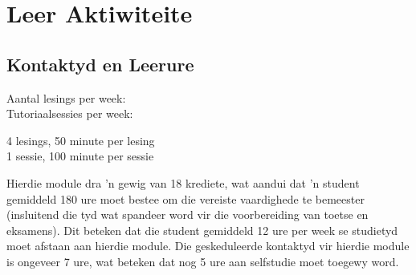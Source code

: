 \section{Leer Aktiwiteite}
    \subsection{Kontaktyd en Leerure}
        \begin{minipage}{0.4\linewidth}
            Aantal lesings per week: \\
            Tutoriaalsessies per week:
        \end{minipage}
        \begin{minipage}{0.4\linewidth}
            4 lesings, 50 minute per lesing \\
            1 sessie, 100 minute per sessie
        \end{minipage}

        Hierdie module dra 'n gewig van 18 krediete, wat aandui dat 'n student 
        gemiddeld 180 ure moet bestee om die vereiste vaardighede te bemeester
        (insluitend die tyd wat spandeer word vir die voorbereiding van toetse
        en eksamens).  Dit beteken dat die student gemiddeld 12 ure per week se studietyd
        moet afstaan aan hierdie module.  Die geskeduleerde kontaktyd vir hierdie
        module is ongeveer 7 ure, wat beteken dat nog 5 ure aan selfstudie moet toegewy word.
    
